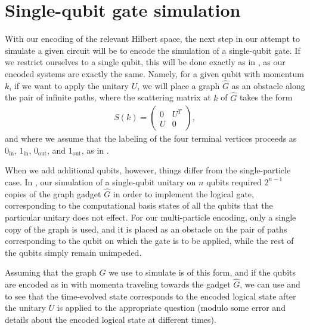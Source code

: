 \documentclass[../thesis-main/thesis-main]{subfiles}
\begin{document}
\section{Single-qubit gate simulation}\label{sec:MP_single_qubit_gate_simulation}

With our encoding of the relevant Hilbert space, the next step in our attempt to simulate a given circuit will be to encode the simulation of a single-qubit gate. If we restrict ourselves to a single qubit, this will be done exactly as in , as our encoded systems are exactly the same.  Namely, for a given qubit with momentum $k$, if we want to apply the unitary $U$, we will place a graph $\widehat{G}$ as an obstacle along the pair of infinite paths, where the scattering matrix at $k$ of $\widehat{G}$ takes the form
\begin{align}
  S(k) = \begin{pmatrix}
    0& U^T\\
    U & 0
  \end{pmatrix},\label{eq:MP_unitary_s_matrix}
\end{align}
and where we assume that the labeling of the four terminal vertices proceeds as $0_{\text{in}}$, $1_{\text{in}}$, $0_{\text{out}}$, and $1_{\text{out}}$, as in . 

When we add additional qubits, however, things differ from the single-particle case.  In , our simulation of a single-qubit unitary on $n$ qubits required $2^{n-1}$ copies of the graph gadget $\widehat{G}$ in order to implement the logical gate, corresponding to the computational basis states of all the qubits that the particular unitary does not effect.  For our multi-particle encoding, only a single copy of the graph is used, and it is placed as an obstacle on the pair of paths corresponding to the qubit on which the gate is to be applied, while the rest of the qubits simply remain unimpeded.  

Assuming that the graph $G$ we use to simulate is of this form, and if the qubits are encoded as in  with momenta traveling towards the gadget $\widehat{G}$, we can use  and  to see that the time-evolved state corresponds to the encoded logical state after the unitary $U$ is applied to the appropriate question (modulo some error and details about the encoded logical state at different times).  
\end{document}
